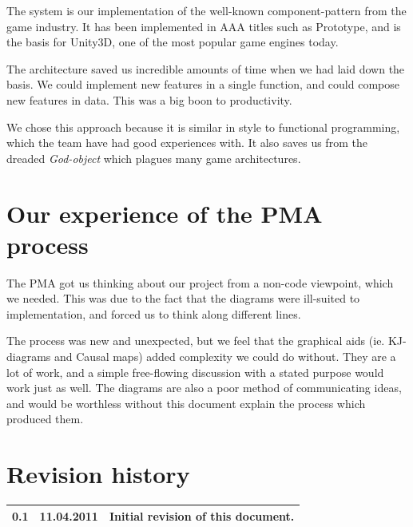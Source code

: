 \documentclass[titlepage,a4paper,11pt]{article}
\begin{document}
The system is our implementation of the well-known component-pattern from
the game industry. It has been implemented in AAA titles such as Prototype,
and is the basis for Unity3D, one of the most popular game engines today.

The architecture saved us incredible amounts of time when we had laid down
the basis. We could implement new features in a single function, and could
compose new features in data. This was a big boon to productivity.

We chose this approach because it is similar in style to functional 
programming, which the team have had good experiences with. It also saves
us from the dreaded \emph{God-object} which plagues many game 
architectures.

\section{Our experience of the PMA process}

The PMA got us thinking about our project from a non-code viewpoint, which
we needed. This was due to the fact that the diagrams were ill-suited to
implementation, and forced us to think along different lines.

The process was new and unexpected, but we feel that the graphical aids
(ie. KJ-diagrams and Causal maps) added complexity we could do without.
They are a lot of work, and a simple free-flowing discussion with a stated
purpose would work just as well.  The diagrams are also a poor method of
communicating ideas, and would be worthless without this document explain
the process which produced them.

\printbibliography


\section{Revision history}

\begin{table}[H]
  \begin{tabular}{| c | c | c |}
    \hline
    0.1 & 11.04.2011 & Initial revision of this document. \\
    \hline
  \end{tabular}
\end{table}
\end{document}
